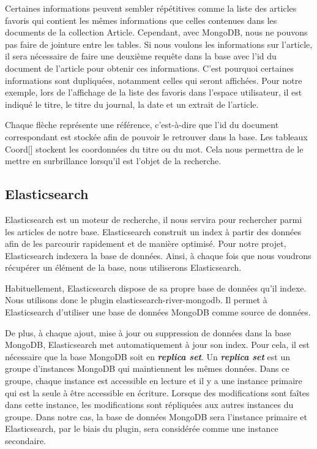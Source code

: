Certaines informations peuvent sembler répétitives comme la liste des articles favoris qui contient les mêmes informations que celles contenues dans les documents de la collection Article. Cependant, avec MongoDB, nous ne pouvons pas faire de jointure entre les tables. Si nous voulons les informations sur l’article, il sera nécessaire de faire une deuxième requête dans la base avec l’id du document de l’article pour obtenir ces informations. C’est pourquoi certaines informations sont dupliquées, notamment celles qui seront affichées. Pour notre exemple, lors de l’affichage de la liste des favoris dans l’espace utilisateur, il est indiqué le titre, le titre du journal, la date et un extrait de l’article. 


Chaque flèche représente une référence, c’est-à-dire que l’id du document correspondant est stockée afin de pouvoir le retrouver dans la base. Les tableaux Coord[] stockent les coordonnées du  titre ou du mot. Cela nous permettra de le mettre en surbrillance lorsqu’il est l’objet de la recherche. 

\subsection{Elasticsearch}

Elasticsearch est un moteur de recherche, il nous servira pour rechercher parmi les articles de notre base. Elasticsearch construit un index à partir des données afin de les parcourir rapidement et de manière optimisé. Pour notre projet, Elasticsearch indexera la base de données. Ainsi, à chaque fois que nous voudrons récupérer un élément de la base, nous utiliserons Elasticsearch. 


Habituellement, Elasticsearch dispose de sa propre base de données qu’il indexe. Nous utilisons donc le plugin elasticsearch-river-mongodb. Il permet à Elasticsearch d’utiliser une base de données MongoDB comme source de données. 


De plus, à chaque ajout, mise à jour ou suppression de données dans la base MongoDB, Elasticsearch met automatiquement à jour son index. Pour cela, il est nécessaire que la base MongoDB soit en \textbf{\textit{replica set}}.  Un \textbf{\textit{replica set}} est un groupe d’instances MongoDB qui maintiennent les mêmes données. Dans ce groupe, chaque instance est accessible en lecture et il y a une instance primaire qui est la seule à être accessible en écriture. Lorsque des modifications sont faîtes dans cette instance, les modifications sont répliquées aux autres instances du groupe. Dans notre cas, la base de données MongoDB sera l’instance primaire et Elasticsearch, par le biais du plugin, sera considérée comme une instance secondaire.


